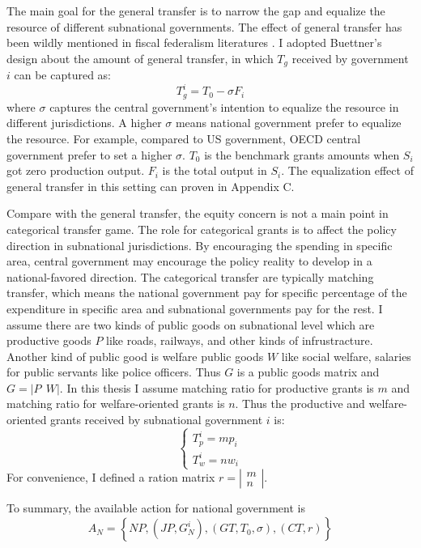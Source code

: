 \begin{itemize}
The main goal for the general transfer is to narrow the gap and equalize the resource of different subnational governments. The effect of general transfer has been wildly mentioned in fiscal federalism literatures \cite{buettner2006incentive,lv2018transfer}. I adopted Buettner's design about the amount of general transfer, in which $T_g$ received by government $i$ can be captured as:
$$T_g^i = T_0 - \sigma F_i $$ \label{generaltransfer}
where $\sigma$ captures the central government's intention to equalize the resource in different jurisdictions. A higher $\sigma$ means national government prefer to equalize the resource. For example, compared to US government, OECD central government prefer to set a higher $\sigma$. $T_0$ is the benchmark grants amounts when $S_i$ got zero production output. $F_i$ is the total output in $S_i$. The equalization effect of general transfer in this setting can proven in Appendix C.

Compare with the general transfer, the equity concern is not a main point in categorical transfer game. The role for categorical grants is to affect the policy direction in subnational jurisdictions. By encouraging the spending in specific area, central government may encourage the policy reality to develop in a national-favored direction. The categorical transfer are typically matching transfer, which means the national government pay for specific percentage of the expenditure in specific area and subnational governments pay for the rest. I assume there are two kinds of public goods on subnational level which are productive goods $P$ like roads, railways, and other kinds of infrustracture. Another kind of public good is welfare public goods $W$ like social welfare, salaries for public servants like police officers. Thus $G$ is a public goods matrix and $G=|P\ \  W|$. \label{pgmatrix}
In this thesis I assume matching ratio for productive grants is $m$ and matching ratio for welfare-oriented grants is $n$. Thus the productive and welfare-oriented grants received by subnational government $i$ is:
$$
    \left\{\begin{array}{l}
        T_p^i=m p_i \\
        T_w^i=n w_i
    \end{array}\right.
$$
For convenience, I defined a ration matrix $r=\left|\begin{array}{l}m \\ n\end{array}\right|$. \label{mrmatrix}

To summary, the available action for national government is $$A_N=\left\{N P,\left(J P, G_N^i\right),\left(G T, T_0, \sigma\right),(C T, r)\right\} $$


\end{itemize}
